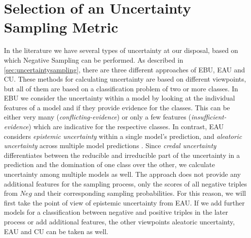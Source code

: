 \section{Selection of an Uncertainty Sampling Metric} 
\label{sec:selection_of_an_uncertainty_sampling_metric}
In the literature we have several types of uncertainty at our disposal, based on which Negative Sampling can be performed.
As described in \autoref{sec:uncertaintysampling}, there are three different approaches of \ac{EBU}, \ac{EAU} and \ac{CU}.
These methods for calculating uncertainty are based on different viewpoints, but all of them are based on a classification problem of two or more classes.
In \ac{EBU} we consider the uncertainty within a model by looking at the individual features of a model and if they provide evidence for the classes.
This can be either very many (\textit{conflicting-evidence}) or only a few features (\textit{insufficient-evidence}) which are indicative for the respective classes.
In contrast, \ac{EAU} considers \textit{epistemic uncertainty} within a single model’s prediction, and \textit{aleatoric uncertainty} across multiple model predictions \cite{human-in-the-loop}.
Since \textit{credal uncertainty} differentiates between the reducible and irreducible part of the uncertainty in a prediction and the domination of one class over the other, we calculate uncertainty among multiple models as well.
The \kbgan approach does not provide any additional features for the sampling process, only the scores of all negative triples from $Neg$ and their corresponding sampling probabilities.
For this reason, we will first take the point of view of epistemic uncertainty from \ac{EAU}.
If we add further models for a classification between negative and positive triples in the later process or add additional features, the other viewpoints aleatoric uncertainty, \ac{EAU} and \ac{CU} can be taken as well.
